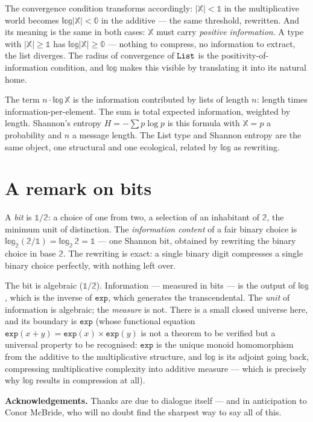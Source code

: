 \documentclass[11pt, a4paper]{article}
\theoremstyle{pearlstyle}
\newcommand{\bone}{\mathbb{1}}
\newcommand{\btwo}{\mathbb{2}}
\newcommand{\bzero}{\mathbb{0}}
\newcommand{\Exp}{\mathtt{exp}}
\begin{document}
The convergence condition transforms accordingly: $|\mathbb{X}| < \bone$ in the
multiplicative world becomes $\mathbb{log}|\mathbb{X}| < \bzero$ in the
additive --- the same threshold, rewritten. And its meaning is the same in both
cases: $\mathbb{X}$ must carry \emph{positive information}. A type with
$|\mathbb{X}| \geq \bone$ has $\mathbb{log}|\mathbb{X}| \geq \bzero$ --- nothing
to compress, no information to extract, the list diverges. The radius of
convergence of ${\tt List}$ is the positivity-of-information condition, and
$\mathbb{log}$ makes this visible by translating it into its natural home.

The term $n \cdot \mathbb{log}\, \mathbb{X}$ is the information contributed by
lists of length $n$: length times information-per-element. The sum is total
expected information, weighted by length. Shannon's entropy $H = -\sum p \log p$
is this formula with $\mathbb{X} = p$ a probability and $n$ a message length.
The List type and Shannon entropy are the same object, one structural and one
ecological, related by $\mathbb{log}$ as rewriting.

\section{A remark on bits}

A \emph{bit} is $\bone/\btwo$: a choice of one from two, a selection of an
inhabitant of $\btwo$, the minimum unit of distinction. The \emph{information
content} of a fair binary choice is $\mathbb{log}_{\btwo}(\btwo/\bone) =
\mathbb{log}_{\btwo}\, \btwo = \bone$ --- one Shannon bit, obtained by rewriting
the binary choice in base $\btwo$. The rewriting is exact: a single binary
digit compresses a single binary choice perfectly, with nothing left over.

The bit is algebraic ($\bone/\btwo$). Information --- measured in bits --- is
the output of $\mathbb{log}$, which is the inverse of $\Exp$, which generates
the transcendental. The \emph{unit} of information is algebraic; the
\emph{measure} is not. There is a small closed universe here, and its boundary
is $\Exp$ (whose functional equation $\Exp(x + y) = \Exp(x) \times \Exp(y)$
is not a theorem to be verified but a universal property to be recognised:
$\Exp$ is the unique monoid homomorphism from the additive to the
multiplicative structure, and $\mathbb{log}$ is its adjoint going back,
compressing multiplicative complexity into additive measure --- which is
precisely why $\mathbb{log}$ results in compression at all).

\bigskip
\noindent\textbf{Acknowledgements.} Thanks are due to dialogue itself --- and
in anticipation to Conor McBride, who will no doubt find the sharpest way to
say all of this.
\end{document}
